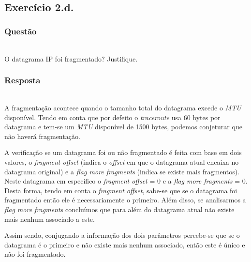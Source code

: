 \documentclass{llncs}
\begin{document}

\subsection{Exercício 2.d.}
\subsubsection{Questão}\rule[-10pt]{0pt}{10pt}\\

O datagrama IP foi fragmentado? Justifique.

\subsubsection{Resposta}\rule[-10pt]{0pt}{10pt}\\

A fragmentação acontece quando o tamanho total do datagrama excede o \textit{MTU} disponível. Tendo em conta que por defeito o \textit{traceroute} usa 60 bytes por datagrama e tem-se um \textit{MTU} disponível de 1500 bytes, podemos conjeturar que não haverá fragmentação.
	
A verificação se um datagrama foi ou não fragmentado é feita com base em dois valores, o \textit{fragment offset} (indica o \textit{offset} em que o datagrama atual encaixa no datagrama original) e a \textit{flag more fragments} (indica se existe mais fragmentos). Neste datagrama em específico o \textit{fragment offset} = 0 e a \textit{flag more fragments} = 0. Desta forma, tendo em conta o \textit{fragment offset}, sabe-se que se o datagrama foi fragmentado então ele é necessariamente o primeiro. Além disso, se analisarmos a \textit{flag more fragments} concluímos que para além do datagrama atual não existe mais nenhum associado a este. 

Assim sendo, conjugando a informação dos dois parâmetros percebe-se que se o datagrama é o primeiro e não existe mais nenhum associado, então este é único e não foi fragmentado.
\end{document}

